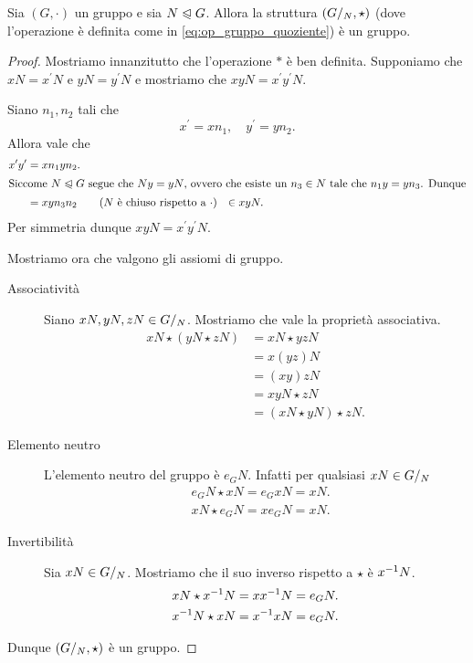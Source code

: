 \begin{proposition}
    Sia $(G, \cdot)$ un gruppo e sia $N \trianglelefteqslant G$. Allora la struttura $({G}/_{N}, \star)$ (dove l'operazione è definita come in \eqref{eq:op_gruppo_quoziente}) è un gruppo.
\end{proposition}
\begin{proof}
    Mostriamo innanzitutto che l'operazione $*$ è ben definita.
    Supponiamo che $xN = x^\prime N$ e $yN = y^\prime N$ e mostriamo che $xyN = x^\prime y^\prime N$.

    Siano $n_1, n_2$ tali che \[
        x^\prime = xn_1, \quad y^\prime = yn_2.    
    \] Allora vale che \begin{align*}
        x^\prime y^\prime &= xn_1 yn_2.\\
        \intertext{Siccome $N \trianglelefteqslant G$ segue che $Ny = yN$, ovvero che esiste un $n_3 \in N$ tale che $n_1y = yn_3$. Dunque}
        &= xy n_3n_2 \tag{$N$ è chiuso rispetto a $\cdot$}
        &\in xyN.
    \end{align*}
    Per simmetria dunque $xyN = x^\prime y^\prime N$.

    Mostriamo ora che valgono gli assiomi di gruppo.
    \begin{description}
        \item[Associatività] Siano $xN, yN, zN \in {G}/_{N}$. Mostriamo che vale la proprietà associativa.
        \begin{align*}
            xN \star (yN \star zN) &= xN \star yzN \\
            &= x(yz)N \tag{ass. in $G$}\\
            &= (xy)zN \\
            &= xyN \star zN \\
            &= (xN \star yN) \star zN.
        \end{align*}
        \item[Elemento neutro] L'elemento neutro del gruppo è $e_GN$. Infatti per qualsiasi $xN \in {G}/_{N}$ \begin{align*}
            &e_GN \star xN = e_GxN = xN.\\
            &xN \star e_GN = xe_GN = xN.
        \end{align*}
        \item[Invertibilità] Sia $xN \in {G}/_{N}$. Mostriamo che il suo inverso rispetto a $\star$ è $x^{-1} N$.
        \begin{align*}
            &xN \star x^{-1} N = xx^{-1} N = e_GN.\\
            &x^{-1} N \star xN = x^{-1} xN = e_GN.
        \end{align*} 
    \end{description}
    Dunque $({G}/_{N}, \star)$ è un gruppo.
\end{proof}

